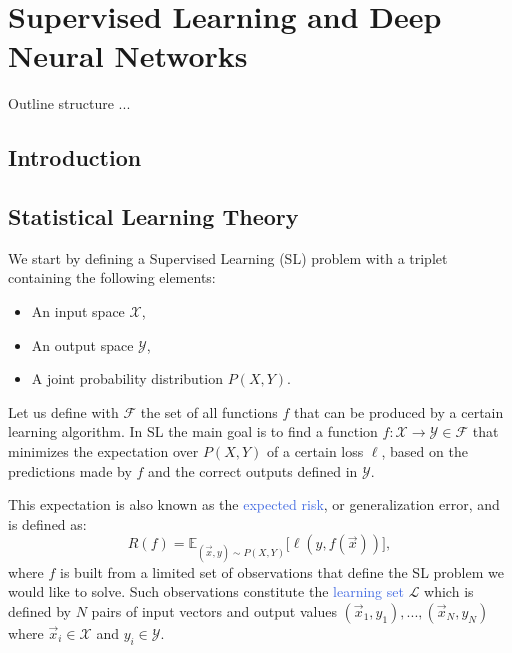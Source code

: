 \chapter{Supervised Learning and Deep Neural Networks}
\label{ch:supervised_learning}

\begin{remark}{Outline}
structure ...
\end{remark}

\section{Introduction}
\label{sec:introduction01}


\section{Statistical Learning Theory}
\label{sec:learning_from_data}

We start by defining a Supervised Learning (SL) problem with a triplet containing the following elements:
\begin{itemize}
	\item An input space $\mathcal{X}$,
	\item An output space $\mathcal{Y}$,
	\item A joint probability distribution $P(X,Y)$.
\end{itemize}
Let us define with $\mathcal{F}$ the set of all functions $f$ that can be produced by a certain learning algorithm. In SL the main goal is to find a function $f:\mathcal{X}\rightarrow\mathcal{Y} \in \mathcal{F}$ that minimizes the expectation over $P(X,Y)$ of a certain loss $\ell$, based on the predictions made by $f$ and the correct outputs defined in $\mathcal{Y}$.

This expectation is also known as the \textcolor{RoyalBlue}{expected risk}, or generalization error, and is defined as:
\begin{equation}
	R(f) = \mathds{E}_{(\vec{x},y)\sim P(X,Y)} \big[\ell(y,f(\vec{x}))\big],
\label{eq:expected_risk}
\end{equation}
where $f$ is built from a limited set of observations that define the SL problem we would like to solve. Such observations constitute the \textcolor{RoyalBlue}{learning set} $\mathcal{L}$ which is defined by $N$ pairs of input vectors and output values $(\vec{x}_1, y_1),...,(\vec{x}_N, y_N)$ where $\vec{x}_i \in \mathcal{X}$ and $y_i \in \mathcal{Y}$. 

